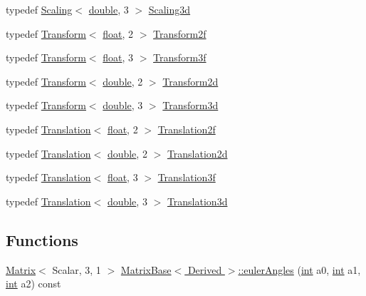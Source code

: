 \begin{DoxyCompactItemize}
\item 
typedef \hyperlink{class_scaling}{Scaling}$<$ \hyperlink{_super_l_u_support_8h_a8956b2b9f49bf918deed98379d159ca7}{double}, 3 $>$ \hyperlink{group___geometry___module_gaf3a886c00ace0d612f1c08d1a2ccc5a7}{Scaling3d}
\item 
typedef \hyperlink{class_transform}{Transform}$<$ \hyperlink{_super_l_u_support_8h_a6a1bb6ed41f44b60e7bd83b0e9945aa7}{float}, 2 $>$ \hyperlink{group___geometry___module_ga286ec38c39d5e356dbfea7d695f09a41}{Transform2f}
\item 
typedef \hyperlink{class_transform}{Transform}$<$ \hyperlink{_super_l_u_support_8h_a6a1bb6ed41f44b60e7bd83b0e9945aa7}{float}, 3 $>$ \hyperlink{group___geometry___module_gac2cfea9409b1ac589cc20f259b6189eb}{Transform3f}
\item 
typedef \hyperlink{class_transform}{Transform}$<$ \hyperlink{_super_l_u_support_8h_a8956b2b9f49bf918deed98379d159ca7}{double}, 2 $>$ \hyperlink{group___geometry___module_ga50b7384fd223c0bbe68f07f45770e155}{Transform2d}
\item 
typedef \hyperlink{class_transform}{Transform}$<$ \hyperlink{_super_l_u_support_8h_a8956b2b9f49bf918deed98379d159ca7}{double}, 3 $>$ \hyperlink{group___geometry___module_ga93f2bb4699ee3ff37ff156a9c7a12d7c}{Transform3d}
\item 
typedef \hyperlink{class_translation}{Translation}$<$ \hyperlink{_super_l_u_support_8h_a6a1bb6ed41f44b60e7bd83b0e9945aa7}{float}, 2 $>$ \hyperlink{group___geometry___module_ga94a8401d6caf6c9688fd14a17297fa20}{Translation2f}
\item 
typedef \hyperlink{class_translation}{Translation}$<$ \hyperlink{_super_l_u_support_8h_a8956b2b9f49bf918deed98379d159ca7}{double}, 2 $>$ \hyperlink{group___geometry___module_gaa0b48ef208ba6abeb7f4786b552a3bc4}{Translation2d}
\item 
typedef \hyperlink{class_translation}{Translation}$<$ \hyperlink{_super_l_u_support_8h_a6a1bb6ed41f44b60e7bd83b0e9945aa7}{float}, 3 $>$ \hyperlink{group___geometry___module_ga53a248891c9ce7fb37ed793cd85eed85}{Translation3f}
\item 
typedef \hyperlink{class_translation}{Translation}$<$ \hyperlink{_super_l_u_support_8h_a8956b2b9f49bf918deed98379d159ca7}{double}, 3 $>$ \hyperlink{group___geometry___module_gac7244ecac036525fb23aad8d3bf3209f}{Translation3d}
\end{DoxyCompactItemize}
\subsection*{Functions}
\begin{DoxyCompactItemize}
\item 
\hyperlink{class_matrix}{Matrix}$<$ Scalar, 3, 1 $>$ \hyperlink{group___geometry___module_gab4c96680314b250adc57bf81a2106f5d}{Matrix\-Base$<$ Derived $>$\-::euler\-Angles} (\hyperlink{ioapi_8h_a787fa3cf048117ba7123753c1e74fcd6}{int} a0, \hyperlink{ioapi_8h_a787fa3cf048117ba7123753c1e74fcd6}{int} a1, \hyperlink{ioapi_8h_a787fa3cf048117ba7123753c1e74fcd6}{int} a2) const 
\end{DoxyCompactItemize}


